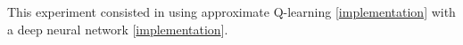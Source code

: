 \documentclass{article}
\newcommand{\GithubURL}[1]{[\href{https://github.com/davidrobles/mlnd-capstone-code/blob/master/#1}{implementation}]}
\begin{document}
This experiment consisted in using approximate Q-learning
\GithubURL{capstone/rl/learners/qlearning_approx.py} with a deep neural network
\GithubURL{capstone/rl/value_functions/c4deepnetwork.py}.




















\end{document}
